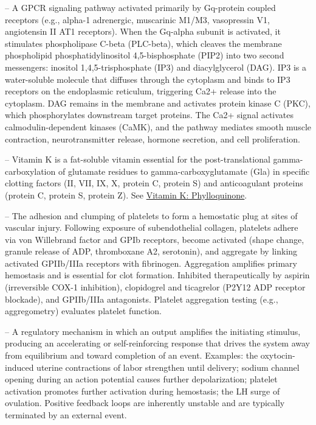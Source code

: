-- A GPCR signaling pathway activated primarily by Gq-protein coupled receptors (e.g., alpha-1 adrenergic, muscarinic M1/M3, vasopressin V1, angiotensin II AT1 receptors). When the Gq-alpha subunit is activated, it stimulates phospholipase C-beta (PLC-beta), which cleaves the membrane phospholipid phosphatidylinositol 4,5-bisphosphate (PIP2) into two second messengers: inositol 1,4,5-trisphosphate (IP3) and diacylglycerol (DAG). IP3 is a water-soluble molecule that diffuses through the cytoplasm and binds to IP3 receptors on the endoplasmic reticulum, triggering Ca2+ release into the cytoplasm. DAG remains in the membrane and activates protein kinase C (PKC), which phosphorylates downstream target proteins. The Ca2+ signal activates calmodulin-dependent kinases (CaMK), and the pathway mediates smooth muscle contraction, neurotransmitter release, hormone secretion, and cell proliferation.

-- Vitamin K is a fat-soluble vitamin essential for the post-translational gamma-carboxylation of glutamate residues to gamma-carboxyglutamate (Gla) in specific clotting factors (II, VII, IX, X, protein C, protein S) and anticoagulant proteins (protein C, protein S, protein Z). See \hyperlink{Vitamin K: Phylloquinone}{Vitamin K: Phylloquinone}.

-- The adhesion and clumping of platelets to form a hemostatic plug at sites of vascular injury. Following exposure of subendothelial collagen, platelets adhere via von Willebrand factor and GPIb receptors, become activated (shape change, granule release of ADP, thromboxane A2, serotonin), and aggregate by linking activated GPIIb/IIIa receptors with fibrinogen. Aggregation amplifies primary hemostasis and is essential for clot formation. Inhibited therapeutically by aspirin (irreversible COX-1 inhibition), clopidogrel and ticagrelor (P2Y12 ADP receptor blockade), and GPIIb/IIIa antagonists. Platelet aggregation testing (e.g., aggregometry) evaluates platelet function.

-- A regulatory mechanism in which an output amplifies the initiating stimulus, producing an accelerating or self-reinforcing response that drives the system away from equilibrium and toward completion of an event. Examples: the oxytocin-induced uterine contractions of labor strengthen until delivery; sodium channel opening during an action potential causes further depolarization; platelet activation promotes further activation during hemostasis; the LH surge of ovulation. Positive feedback loops are inherently unstable and are typically terminated by an external event.

